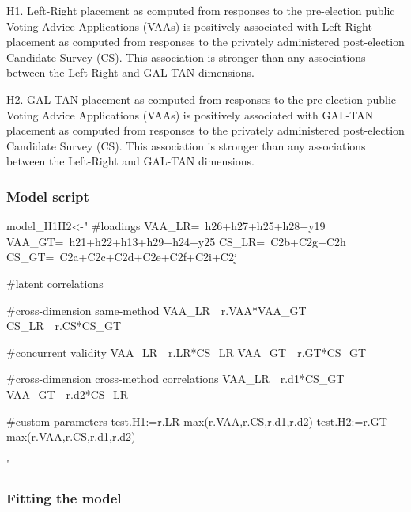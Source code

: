 \documentclass[
]{article}
\newenvironment{Shaded}{\begin{snugshade}}{\end{snugshade}}
\newcommand{\NormalTok}[1]{#1}
\newcommand{\StringTok}[1]{\textcolor[rgb]{0.31,0.60,0.02}{#1}}
\begin{document}
H1. Left-Right placement as computed from responses to the pre-election
public Voting Advice Applications (VAAs) is positively associated with
Left-Right placement as computed from responses to the privately
administered post-election Candidate Survey (CS). This association is
stronger than any associations between the Left-Right and GAL-TAN
dimensions.

H2. GAL-TAN placement as computed from responses to the pre-election
public Voting Advice Applications (VAAs) is positively associated with
GAL-TAN placement as computed from responses to the privately
administered post-election Candidate Survey (CS). This association is
stronger than any associations between the Left-Right and GAL-TAN
dimensions.

\hypertarget{model-script}{%
\subsubsection{Model script}\label{model-script}}

\begin{Shaded}
\begin{Highlighting}[]
\NormalTok{model_H1H2<-}\StringTok{"}
\StringTok{#loadings}
\StringTok{VAA_LR=~h26+h27+h25+h28+y19}
\StringTok{VAA_GT=~h21+h22+h13+h29+h24+y25}
\StringTok{CS_LR=~C2b+C2g+C2h}
\StringTok{CS_GT=~C2a+C2c+C2d+C2e+C2f+C2i+C2j}

\StringTok{#latent correlations}

\StringTok{#cross-dimension same-method}
\StringTok{VAA_LR~~r.VAA*VAA_GT}
\StringTok{CS_LR~~r.CS*CS_GT}

\StringTok{#concurrent validity}
\StringTok{VAA_LR~~r.LR*CS_LR}
\StringTok{VAA_GT~~r.GT*CS_GT}

\StringTok{#cross-dimension cross-method correlations}
\StringTok{VAA_LR~~r.d1*CS_GT}
\StringTok{VAA_GT~~r.d2*CS_LR}

\StringTok{#custom parameters}
\StringTok{test.H1:=r.LR-max(r.VAA,r.CS,r.d1,r.d2)}
\StringTok{test.H2:=r.GT-max(r.VAA,r.CS,r.d1,r.d2)}

\StringTok{"}
\end{Highlighting}
\end{Shaded}

\hypertarget{fitting-the-model}{%
\subsubsection{Fitting the model}\label{fitting-the-model}}
\end{document}

